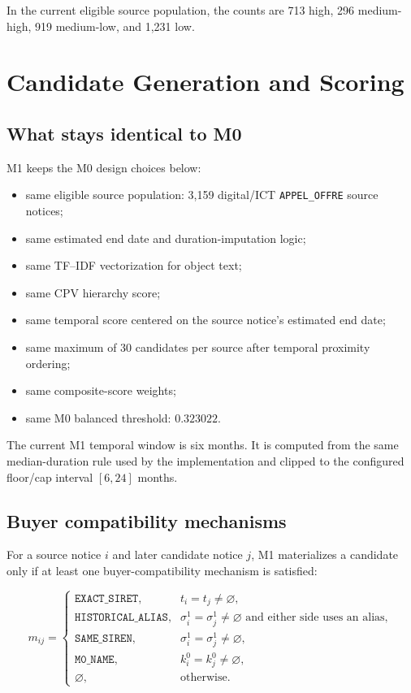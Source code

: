 \documentclass[11pt]{article}
\begin{document}
In the current eligible source population, the counts are 713 high,
296 medium-high, 919 medium-low, and 1,231 low.

\section{Candidate Generation and Scoring}
\label{sec:candidates}

\subsection{What stays identical to M0}

M1 keeps the M0 design choices below:

\begin{itemize}
  \item same eligible source population: 3,159 digital/ICT
        \texttt{APPEL\_OFFRE} source notices;
  \item same estimated end date and duration-imputation logic;
  \item same TF--IDF vectorization for object text;
  \item same CPV hierarchy score;
  \item same temporal score centered on the source notice's estimated end
        date;
  \item same maximum of 30 candidates per source after temporal proximity
        ordering;
  \item same composite-score weights;
  \item same M0 balanced threshold: \(0.323022\).
\end{itemize}

The current M1 temporal window is six months. It is computed from the same
median-duration rule used by the implementation and clipped to the
configured floor/cap interval \([6,24]\) months.

\subsection{Buyer compatibility mechanisms}

For a source notice \(i\) and later candidate notice \(j\), M1 materializes
a candidate only if at least one buyer-compatibility mechanism is satisfied:

\[
m_{ij} =
\begin{cases}
\texttt{EXACT\_SIRET}, & t_i=t_j \ne \varnothing,\\
\texttt{HISTORICAL\_ALIAS}, & \sigma_i^{1}=\sigma_j^{1}\ne\varnothing
  \text{ and either side uses an alias},\\
\texttt{SAME\_SIREN}, & \sigma_i^{1}=\sigma_j^{1}\ne\varnothing,\\
\texttt{M0\_NAME}, & k_i^{0}=k_j^{0}\ne\varnothing,\\
\varnothing, & \text{otherwise.}
\end{cases}
\]
\end{document}
